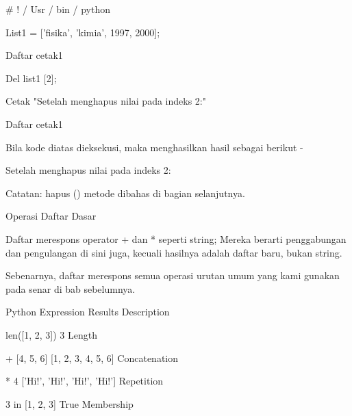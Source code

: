 \vspace{12pt}
   \#  ! / Usr / bin / python \par
\vspace{12pt}
List1 = ['fisika', 'kimia', 1997, 2000]; \par
\vspace{12pt}
Daftar cetak1 \par
\vspace{12pt}
Del list1 [2]; \par
\vspace{12pt}
Cetak "Setelah menghapus nilai pada indeks 2:" \par
\vspace{12pt}
Daftar cetak1 \par
Bila kode diatas dieksekusi, maka menghasilkan hasil sebagai berikut - \par
['Fisika', 'kimia', 1997, 2000] \par
Setelah menghapus nilai pada indeks 2: \par
['Fisika', 'kimia', 2000] \par
Catatan: hapus () metode dibahas di bagian selanjutnya. \par
Operasi Daftar Dasar \par
Daftar merespons operator + dan * seperti string; Mereka berarti penggabungan dan pengulangan di sini juga, kecuali hasilnya adalah daftar baru, bukan string. \par
Sebenarnya, daftar merespons semua operasi urutan umum yang kami gunakan pada senar di bab sebelumnya. \par
Python Expression \hspace*{0.5in} Results  \hspace*{0.5in} Description \par
len([1, 2, 3]) \hspace*{0.5in} 3 \hspace*{0.5in} Length \par
[1, 2, 3] + [4, 5, 6] \hspace*{0.5in} [1, 2, 3, 4, 5, 6] \hspace*{0.5in} Concatenation \par
['Hi!'] * 4 \hspace*{0.5in} ['Hi!', 'Hi!', 'Hi!', 'Hi!'] \hspace*{0.5in} Repetition \par
3 in [1, 2, 3] \hspace*{0.5in} True \hspace*{0.5in} Membership \par
